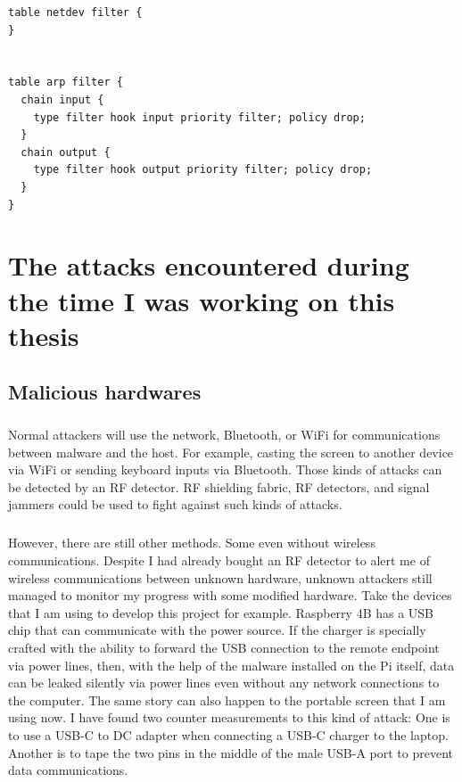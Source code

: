 \documentclass[mscthesis]{usiinfthesis}
\begin{document}
\begin{lstlisting}[language={},frame=single,breaklines=true,postbreak=\mbox{\textcolor{red}{$\hookrightarrow$}\space}]
table netdev filter {
}


table arp filter {
  chain input {
    type filter hook input priority filter; policy drop;
  }
  chain output {
    type filter hook output priority filter; policy drop;
  }
}
\end{lstlisting}

\chapter{The attacks encountered during the time I was working on this thesis}

\section{Malicious hardwares}
\paragraph{}
Normal attackers will use the network, Bluetooth, or WiFi for communications between malware and the host. For example, casting the screen to another device via WiFi or sending keyboard inputs via Bluetooth. Those kinds of attacks can be detected by an RF detector. RF shielding fabric, RF detectors, and signal jammers could be used to fight against such kinds of attacks.
\paragraph{}
However, there are still other methods. Some even without wireless communications. Despite I had already bought an RF detector to alert me of wireless communications between unknown hardware, unknown attackers still managed to monitor my progress with some modified hardware. Take the devices that I am using to develop this project for example. Raspberry 4B has a USB chip that can communicate with the power source. If the charger is specially crafted with the ability to forward the USB connection to the remote endpoint via power lines, then, with the help of the malware installed on the Pi itself, data can be leaked silently via power lines even without any network connections to the computer. The same story can also happen to the portable screen that I am using now. I have found two counter measurements to this kind of attack: One is to use a USB-C to DC adapter when connecting a USB-C charger to the laptop. Another is to tape the two pins in the middle of the male USB-A port to prevent data communications.
\end{document}
